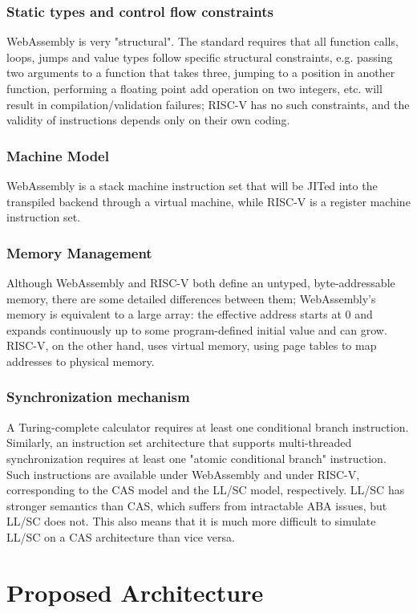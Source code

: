 \documentclass{article}
\begin{document}
\subsubsection{Static types and control flow constraints}
WebAssembly is very "structural". The standard requires that all function calls, loops, jumps and value types follow specific structural constraints, e.g. passing two arguments to a function that takes three, jumping to a position in another function, performing a floating point add operation on two integers, etc. will result in compilation/validation failures; RISC-V has no such constraints, and the validity of instructions depends only on their own coding.
\subsubsection{Machine Model}
WebAssembly is a stack machine instruction set that will be JITed into the transpiled backend through a virtual machine, while RISC-V is a register machine instruction set.
\subsubsection{Memory Management}
Although WebAssembly and RISC-V both define an untyped, byte-addressable memory, there are some detailed differences between them; WebAssembly's memory is equivalent to a large array: the effective address starts at 0 and expands continuously up to some program-defined initial value and can grow. RISC-V, on the other hand, uses virtual memory, using page tables to map addresses to physical memory.
\subsubsection{Synchronization mechanism}
A Turing-complete calculator requires at least one conditional branch instruction. Similarly, an instruction set architecture that supports multi-threaded synchronization requires at least one "atomic conditional branch" instruction. Such instructions are available under WebAssembly and under RISC-V, corresponding to the CAS model and the LL/SC model, respectively. LL/SC has stronger semantics than CAS, which suffers from intractable ABA issues, but LL/SC does not. This also means that it is much more difficult to simulate LL/SC on a CAS architecture than vice versa.

\section{Proposed Architecture}
\end{document}
